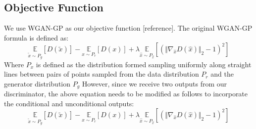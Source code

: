 \subsection{Objective Function}
We use WGAN-GP as our objective function [reference]. The original WGAN-GP formula is defined as:
\begin{equation}
\underset{\tilde{x} \sim P_g}{\mathbb{E}}[D(\tilde{x})] - \underset{x \sim P_r}{\mathbb{E}}[D(x)] + \lambda \underset{\hat{x} \sim P_\hat{x}}{\mathbb{E}}[(\Vert \nabla_\hat{x} D(\hat{x}) \Vert_2 - 1)^2]
\end{equation}
Where $P_x$ is defined as the distribution formed sampling uniformly along straight lines between pairs of points sampled from the data distribution $P_r$ and the generator distribution $P_g$
However, since we receive two outputs from our discriminator, the above equation needs to be modified as follows to incorporate the conditional and unconditional outputs:
\begin{equation}
\underset{\tilde{x} \sim P_g}{\mathbb{E}}[D(\tilde{x})] - \underset{x \sim P_r}{\mathbb{E}}[D(x)] + \lambda \underset{\hat{x} \sim P_\hat{x}}{\mathbb{E}}[(\Vert \nabla_\hat{x} D(\hat{x}) \Vert_2 - 1)^2]
\end{equation}